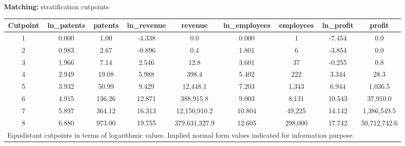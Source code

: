 \documentclass{beamer} %
\begin{document}
\begin{frame}[label=cutpoints]{\textbf{Matching:} stratification cutpoints}
	\begin{table}[width=\paperwidth]
		\centering
		{ \tiny
		\begin{tabular}{ccccccccc}
			\midrule
			\multicolumn{1}{c}{Cutpoint} & \multicolumn{1}{c}{ln\_patents} & \multicolumn{1}{c}{patents} & \multicolumn{1}{c}{ln\_revenue} & \multicolumn{1}{c}{revenue} & \multicolumn{1}{c}{ln\_employees} & \multicolumn{1}{c}{employees} & \multicolumn{1}{c}{ln\_profit} & \multicolumn{1}{c}{profit} \\
			\midrule
			1     & 0.000 & 1.00  & -4.338 & 0.0   & 0.000 & 1     & -7.454 & 0.0 \\
			2     & 0.983 & 2.67  & -0.896 & 0.4   & 1.801 & 6     & -3.854 & 0.0 \\
			3     & 1.966 & 7.14  & 2.546 & 12.8  & 3.601 & 37    & -0.255 & 0.8 \\
			4     & 2.949 & 19.08 & 5.988 & 398.4 & 5.402 & 222   & 3.344 & 28.3 \\
			5     & 3.932 & 50.99 & 9.429 & 12,448.1 & 7.203 & 1,343  & 6.944 & 1,036.5 \\
			6     & 4.915 & 136.26 & 12.871 & 388,915.8 & 9.003 & 8,131  & 10.543 & 37,910.0 \\
			7     & 5.897 & 364.12 & 16.313 & 12,150,910.2 & 10.804 & 49,225 & 14.142 & 1,386,549.5 \\
			8     & 6.880 & 973.00 & 19.755 & 379,631,327.9 & 12.605 & 298,000 & 17.742 & 50,712,742.6 \\
			\midrule
			\multicolumn{8}{l}{{Equidistant cutpoints in terms of logarithmic values. Implied normal form values indicated for information purpose.}}
		\end{tabular}%
		\label{tab:cutpoints}%
		}
	\end{table}%
\end{frame}
\end{document}
